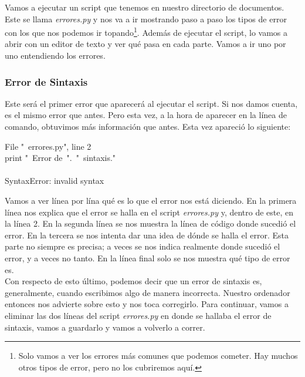 \documentclass[10pt,letterpaper]{article}
\newenvironment{Code}
{
\begin{lrbox}{\selvestebox}%
\begin{minipage}{\dimexpr\columnwidth-2\fboxsep\relax}
\fontfamily{\ttdefault}\selectfont
}
{\end{minipage}\end{lrbox}%
\begin{center}
\colorbox{light-gray}{\usebox{\selvestebox}}
\end{center}
}
\begin{document}
Vamos a ejecutar un script que tenemos en nuestro directorio de documentos. Este se llama \textit{errores.py} y nos va a ir mostrando paso a paso los tipos de error con los que nos podemos ir topando\footnote{Solo vamos a ver los errores m\'as comunes que podemos cometer. Hay muchos otros tipos de error, pero no los cubriremos aqu\'i.}. Adem\'as de ejecutar el script, lo vamos a abrir con un editor de texto y ver qu\'e pasa en cada parte. Vamos a ir uno por uno entendiendo los errores.\\

\subsubsection{Error de Sintaxis}
Este ser\'a el primer error que aparecer\'a al ejecutar el script. Si nos damos cuenta, es el mismo error que antes. Pero esta vez, a la hora de aparecer en la l\'inea de comando, obtuvimos m\'as informaci\'on que antes. Esta vez apareci\'o lo siguiente:

\begin{Code}
{\color{red} \hspace*{4mm} File "\ \hspace{-2mm}errores.py", line 2\\
\hspace*{8mm} print "\ \hspace{-2mm}Error de\ ".\ "\ \hspace{-2mm}sintaxis."\\
\hspace*{63mm}\^\\
SyntaxError: invalid syntax}
\end{Code}

Vamos a ver l\'inea por l\'ina qu\'e es lo que el error nos est\'a diciendo. En la primera l\'inea nos explica que el error se halla en el script \textit{errores.py} y, dentro de este, en la l\'inea 2. En la segunda l\'inea se nos muestra la l\'inea de c\'odigo donde sucedi\'o el error. En la tercera se nos intenta dar una idea de d\'onde se halla el error. Esta parte no siempre es precisa; a veces se nos indica realmente donde sucedi\'o el error, y a veces no tanto. En la l\'inea final solo se nos muestra qu\'e tipo de error es.\\

Con respecto de esto \'ultimo, podemos decir que un error de sintaxis es, generalmente, cuando escribimos algo de manera incorrecta. Nuestro ordenador entonces nos advierte sobre esto y nos toca corregirlo. Para continuar, vamos a eliminar las dos l\'ineas del script \textit{errores.py} en donde se hallaba el error de sintaxis, vamos a guardarlo y vamos a volverlo a correr.
\end{document}
